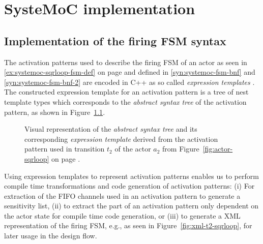 \chapter{SysteMoC implementation}

\section{Implementation of the firing FSM syntax}

The activation patterns used to describe the firing FSM of an actor as seen in \ref{ex:systemoc-sqrloop-fsm-def} on page \pageref{ex:systemoc-sqrloop-fsm-def} and defined in \ref{syn:systemoc-fsm-bnf} and \ref{syn:systemoc-fsm-bnf-2} are encoded in C++ as so called \emph{expression templates} \cite{veldhuizen:1995}.
The constructed expression template for an activation pattern is a tree of nest template types which corresponds to the \emph{abstract syntax tree} of the activation pattern, as shown in Figure~\ref{fig:ast-t2-sqrloop}.

\begin{figure}[h]
\centering
\resizebox{\textwidth}{!}{}
%
\caption{\label{fig:ast-t2-sqrloop}%
Visual representation of the \emph{abstract syntax tree} and its corresponding \emph{expression template} derived from the activation pattern used in transition $t_2$ of the  actor $a_2$ from Figure~\ref{fig:actor-sqrloop} on page \pageref{fig:actor-sqrloop}.
}
\end{figure}

Using expression templates to represent activation patterns enables us to perform compile time transformations and code generation of activation patterns:
(i) For extraction of the FIFO channels used in an activation pattern to generate a sensitivity list,
(ii) to extract the part of an activation pattern only dependent on the actor state for compile time code generation, or
(iii) to generate a XML representation of the firing FSM, e.g., as seen in Figure~\ref{fig:xml-t2-sqrloop}, for later usage in the design flow.

